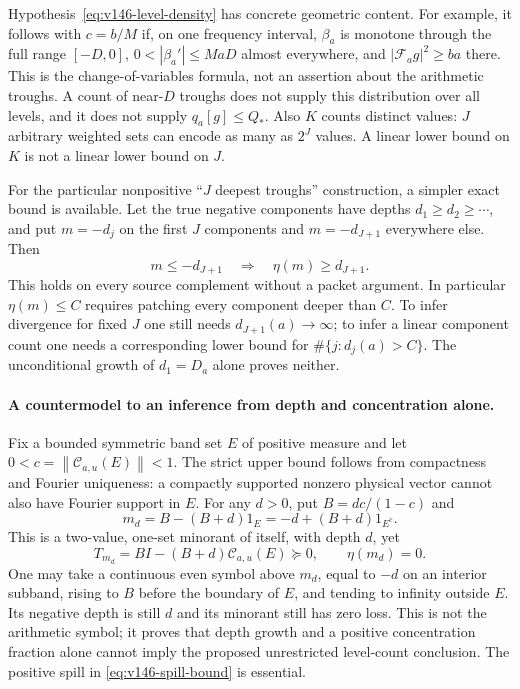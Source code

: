 \documentclass[11pt]{article}
\theoremstyle{remark}
\newcommand{\norm}[1]{\left\lVert #1\right\rVert}
\begin{document}
Hypothesis~\eqref{eq:v146-level-density} has concrete geometric
content. For example, it follows with $c=b/M$ if, on one frequency
interval, $\beta_a$ is monotone through the full range $[-D,0]$,
$0<|\beta_a'|\le MaD$ almost everywhere, and
$|\mathcal F_ag|^2\ge ba$ there. This is the change-of-variables
formula, not an assertion about the arithmetic troughs. A count of
near-$D$ troughs does not supply this distribution over all levels,
and it does not supply $q_a[g]\le Q_*$. Also $K$ counts distinct values:
$J$ arbitrary weighted sets can encode as many as $2^J$ values. A
linear lower bound on $K$ is not a linear lower bound on $J$.

For the particular nonpositive ``$J$ deepest troughs'' construction,
a simpler exact bound is available. Let the true negative components
have depths $d_1\ge d_2\ge\cdots$, and put $m=-d_j$ on the first
$J$ components and $m=-d_{J+1}$ everywhere else. Then
\begin{equation}\label{eq:v146-lobe-floor}
 m\le-d_{J+1}\quad\Longrightarrow\quad\eta(m)\ge d_{J+1}.
\end{equation}
This holds on every source complement without a packet argument.
In particular $\eta(m)\le C$ requires patching every component deeper
than $C$. To infer divergence for fixed $J$ one still needs
$d_{J+1}(a)\to\infty$; to infer a linear component count one needs a
corresponding lower bound for $\#\{j:d_j(a)>C\}$. The unconditional
growth of $d_1=D_a$ alone proves neither.

\paragraph{A countermodel to an inference from depth and concentration alone.}
Fix a bounded symmetric band set $E$ of positive measure and let
$0<c=\norm{\mathcal C_{a,u}(E)}<1$. The strict upper bound follows
from compactness and Fourier uniqueness: a compactly supported
nonzero physical vector cannot also have Fourier support in $E$.
For any $d>0$, put $B=dc/(1-c)$ and
\[
 m_d=B-(B+d)1_E=-d+(B+d)1_{E^c}.
\]
This is a two-value, one-set minorant of itself, with depth $d$, yet
\[
 T_{m_d}=B I-(B+d)\mathcal C_{a,u}(E)\succeq0,
 \qquad \eta(m_d)=0.
\]
One may take a continuous even symbol above $m_d$, equal to $-d$ on
an interior subband, rising to $B$ before the boundary of $E$, and
tending to infinity outside $E$. Its negative depth is still $d$ and
its minorant still has zero loss. This is not the arithmetic symbol;
it proves that depth growth and a positive concentration fraction
alone cannot imply the proposed unrestricted level-count conclusion.
The positive spill in \eqref{eq:v146-spill-bound} is essential.
\end{document}
